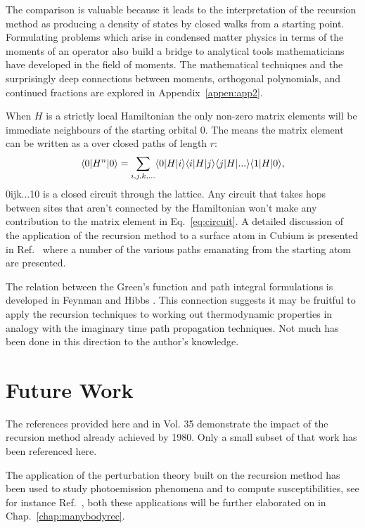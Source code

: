 The comparison is valuable because it leads to the interpretation of 
the recursion method as producing a density of states by closed walks
from a starting point\cite{ducastelle70}. Formulating problems
which arise in condensed matter physics in terms of the moments of
an operator also build a bridge to analytical tools mathematicians
have developed in the field of moments. The mathematical techniques
and the surprisingly deep connections between moments, orthogonal
polynomials, and continued fractions are explored in Appendix~\ref{appen:app2}.

When $H$ is a strictly local Hamiltonian the only non-zero matrix elements 
will be immediate neighbours of the starting orbital $0$. The means
the matrix element can be written as a over closed paths of length $r$:
%
\begin{equation}
\label{eq:circuit}
\langle 0|H^{n}|0 \rangle = \sum_{i,j,k,...}\langle 0|H|i\rangle\langle i|H|j\rangle\langle j|H|...\rangle\langle 1|H|0\rangle,
\end{equation}
%
0ijk...10 is a closed circuit through the lattice. Any circuit that takes hops between sites 
that aren't connected by the Hamiltonian won't make any contribution to the matrix element
in Eq.~\ref{eq:circuit}. A detailed discussion of the application of the recursion method 
to a surface atom in Cubium is presented in Ref.~\cite{haydock75} where a number of the various
paths emanating from the starting atom are presented. 

The relation between the Green's function and path integral formulations is developed
in Feynman and Hibbs \cite{feynmanhibbs64}. This connection suggests it may be fruitful to apply the recursion
techniques to working out thermodynamic properties in analogy with the imaginary time
path propagation techniques. Not much has been done in this direction to the author's 
knowledge.

\section{Future Work}
The references provided here and in Vol. 35 demonstrate the impact of
the recursion method already achieved by 1980. Only a small subset of that
work has been referenced here. 

The application of the perturbation theory built on the recursion method 
has been used to study photoemission phenomena \cite{mclean77}
and to compute susceptibilities, see for instance Ref.~\cite{terakura78},
both these applications will be further elaborated on in Chap.~\ref{chap:manybodyrec}.

